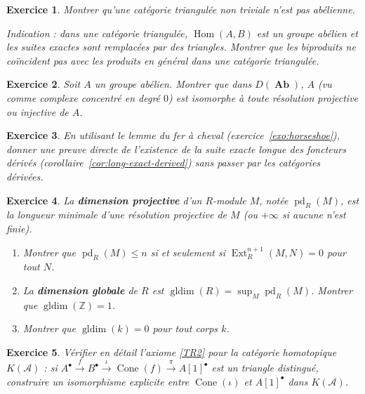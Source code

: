 \documentclass[a4paper,12pt]{book}
\DeclareMathOperator{\Hom}{Hom}
\DeclareMathOperator{\Ab}{\mathbf{Ab}}
\newcommand{\Z}{\mathbb{Z}}
\newtheorem{exercice}{Exercice}[chapter]
\begin{document}
\begin{exercice}\label{exo:triangulated-abelian}
Montrer qu'une catégorie triangulée non triviale n'est pas abélienne.

\textit{Indication : dans une catégorie triangulée, $\Hom(A, B)$ est
un groupe abélien et les suites exactes sont remplacées par des triangles.
Montrer que les biproduits ne coïncident pas avec les produits en général
dans une catégorie triangulée.}
\end{exercice}

\begin{exercice}\label{exo:derived-category-Z}
\index{D(Ab)@$D(\Ab)$}
\index{catégorie!dérivée!de $\Ab$}
Soit $A$ un groupe abélien. Montrer que dans $D(\Ab)$, $A$ (vu comme
complexe concentré en degré $0$) est isomorphe à toute résolution
projective ou injective de $A$.
\end{exercice}

\begin{exercice}\label{exo:horseshoe-derived}
En utilisant le lemme du fer à cheval (exercice~\ref{exo:horseshoe}),
donner une preuve directe de l'existence de la suite exacte longue
des foncteurs dérivés (corollaire~\ref{cor:long-exact-derived})
sans passer par les catégories dérivées.
\end{exercice}

\begin{exercice}\label{exo:dimension-homologique}
La \textbf{dimension projective} d'un
$R$-module $M$, notée $\operatorname{pd}_R(M)$, est la longueur minimale
d'une résolution projective de $M$ (ou $+\infty$ si aucune n'est finie).
\begin{enumerate}[label=(\alph*)]
\item Montrer que $\operatorname{pd}_R(M) \leq n$ si et seulement si
  $\operatorname{Ext}_R^{n+1}(M, N) = 0$ pour tout $N$.
\item La \textbf{dimension globale} de $R$ est
  $\operatorname{gldim}(R) = \sup_M \operatorname{pd}_R(M)$.
  Montrer que $\operatorname{gldim}(\Z) = 1$.
\item Montrer que $\operatorname{gldim}(k) = 0$ pour tout corps $k$.
\end{enumerate}
\end{exercice}

\begin{exercice}\label{exo:rotation-triangle}
Vérifier en détail l'axiome \ref{TR2} pour la catégorie homotopique
$K(\mathcal{A})$ : si $A^\bullet \xrightarrow{f} B^\bullet \xrightarrow{\iota}
\operatorname{Cone}(f) \xrightarrow{\pi} A[1]^\bullet$ est un triangle
distingué, construire un isomorphisme explicite entre
$\operatorname{Cone}(\iota)$ et $A[1]^\bullet$ dans $K(\mathcal{A})$.
\end{exercice}
\end{document}
